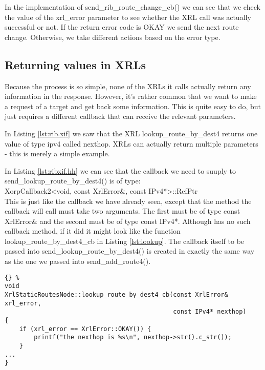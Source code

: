 \documentclass[11pt]{article}
\begin{document}
In the implementation of {\stt send\_rib\_route\_change\_cb()} we can see
that we check the value of the {\stt xrl\_error} parameter to see
whether the XRL call was actually successful or not.
If the return error code is {\stt OKAY} we send the next route change.
Otherwise, we take different actions based on the error type.

\subsection{Returning values in XRLs}

Because the \SRI process is so simple, none of the XRLs it calls
actually return any information in the response.  However, it's rather
common that we want to make a request of a target and get back some
information.  This is quite easy to do, but just requires a different
callback that can receive the relevant parameters.

In Listing \ref{lst:rib.xif} we saw that the XRL
{\stt lookup\_route\_by\_dest4}
returns one value of type {\stt ipv4} called {\stt nexthop}.  XRLs can
actually return multiple parameters - this is merely a simple
example.

In Listing \ref{lst:ribxif.hh} we can see that the callback we need to
suuply to {\stt send\_lookup\_route\_by\_dest4()} is of type:\\ {\stt
XorpCallback2<void, const XrlError\&, const IPv4*>::RefPtr}\\ This is
just like the callback we have already seen, except that the method
the callback will call must take two arguments.  The first must be of
type {\stt const XrlError\&} and the second must be of type {\stt
const IPv4*}.  Although \SRI has no such callback method, if it did it
might look like the function {\stt lookup\_route\_by\_dest4\_cb} in
Listing \ref{lst:lookup}.  The callback itself to be passed into {\stt
send\_lookup\_route\_by\_dest4()} is created in exactly the same way as
the one we passed into {\stt send\_add\_route4()}.

\begin{lstlisting}[caption={Hypothetical callback for  {\stt
	send\_lookup\_route\_by\_dest4()} \label{lst:lookup} }]{} %
void
XrlStaticRoutesNode::lookup_route_by_dest4_cb(const XrlError& xrl_error,
                                              const IPv4* nexthop)
{
    if (xrl_error == XrlError::OKAY()) {
        printf("the nexthop is %s\n", nexthop->str().c_str());
    }
...
}
\end{lstlisting}
\end{document}
